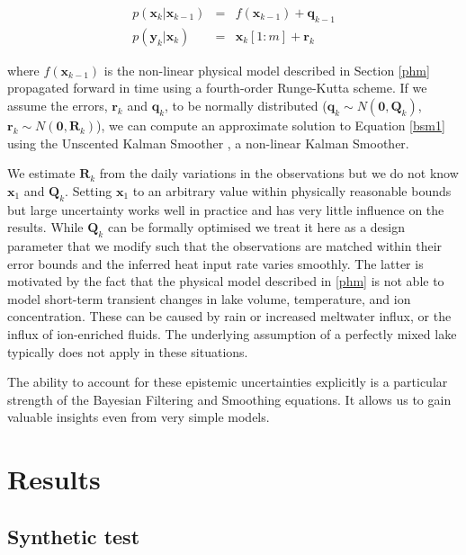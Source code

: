\documentclass[doublespacing]{bmcart}
\newcommand{\bm}[1]{{\textbf{#1}}}
\begin{document}
\begin{eqnarray}
p(\bm{x}_k|\bm{x}_{k-1}) & = & f(\bm{x}_{k-1}) + \bm{q}_{k-1} \\
    p(\bm{y}_k|\bm{x}_k) & = & \bm{x}_k[1:m] + \bm{r}_k   
\end{eqnarray}

where $f(\bm{x}_{k-1})$ is the non-linear physical model described in Section
\ref{phm} propagated forward in time using a fourth-order Runge-Kutta scheme. If
we assume the errors, $\bm{r}_k$ and $\bm{q}_{k}$, to be normally distributed
($\bm{q}_{k} \sim N(\bm{0}, \bm{Q}_{k})$, $\bm{r}_k \sim N(\bm{0}, \bm{R}_k)$),
we can compute an approximate solution to Equation \ref{bsm1} using the
Unscented Kalman Smoother \citep{Merwe2004,
sarkkaBayesianFilteringSmoothing2013}, a non-linear Kalman Smoother.

We estimate $\bm{R}_k$ from the daily variations in the observations but we do
not know $\bm{x}_1$ and $\bm{Q}_{k}$. Setting $\bm{x}_1$ to an arbitrary value
within physically reasonable bounds but large uncertainty works well in practice
and has very little influence on the results. While $\bm{Q}_{k}$ can be formally
optimised we treat it here as a design parameter that we modify such that the
observations are matched within their error bounds and the inferred heat input
rate varies smoothly. The latter is motivated by the fact that the physical
model described in \ref{phm} is not able to model short-term transient changes
in lake volume, temperature, and ion concentration. These can be caused by rain
or increased meltwater influx, or the influx of ion-enriched fluids. The
underlying assumption of a perfectly mixed lake typically does not apply in
these situations. 

The ability to account for these epistemic uncertainties explicitly is a
particular strength of the Bayesian Filtering and Smoothing equations. It allows
us to gain valuable insights even from very simple models. 

\section{Results}
\subsection{Synthetic test}\label{syn_test} 
\end{document}

